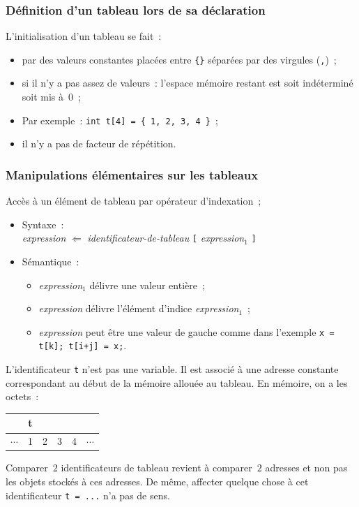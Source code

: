 \begin{frame}
  \frametitle{D\'efinition d'un tableau lors de sa d\'eclaration}
  L'initialisation d'un tableau se fait~:
  \begin{itemize}
  \item par des valeurs constantes plac\'ees entre {\tt \{\}}
    s\'epar\'ees par des virgules ({\tt ,})~;
  \item si il n'y a pas assez de valeurs~: l'espace m\'emoire restant est soit ind\'etermin\'e soit mis \`a~$0$~;
  \item Par exemple~: {\tt int t[4] = \{ 1, 2, 3, 4 \}}~;
  \item il n'y a pas de facteur de r\'ep\'etition.
  \end{itemize}
\end{frame}
\begin{frame}[fragile]
  \frametitle{Manipulations \'el\'ementaires sur les tableaux}
 Acc\`es \`a un \'el\'ement de tableau par op\'erateur d'indexation~;
 \begin{itemize}
 \item Syntaxe~: \\
   {\it expression} $\Leftarrow$ {\it identificateur-de-tableau} 
   {\tt [} {\it expression\/$_1$} {\tt ]}
 \item S\'{e}mantique~:
   \begin{itemize}
   \item {\it expression\/$_1$} d\'elivre une valeur enti\`ere~;
   \item {\it expression} d\'elivre l'\'el\'ement d'indice  {\it
       expression\/$_1$}~;
   \item {\it expression} peut \^etre une valeur de gauche comme
     dans l'exemple {\tt x = t[k]; t[i+j] = x;}.
   \end{itemize}
 \end{itemize}
 L'identificateur \verb?t? n'est pas une variable. Il est associ\'e
 \`a une adresse constante correspondant au d\'ebut de la m\'emoire
allou\'ee au tableau. En m\'emoire, on a les octets~:
 \begin{center}
   \begin{tabular}{c|c|c|c|c|c}
      & t  \\       \hline
      $\cdots$ & 1 & 2 & 3 & 4 &$\cdots$ \\ \hline
    \end{tabular}
  \end{center}
  Comparer~$2$ identificateurs de tableau revient \`a comparer~$2$
  adresses et non pas les objets stock\'es \`a ces adresses.  De
  m\^eme, affecter quelque chose \`a cet identificateur \verb?t = ...?
  n'a pas de sens.  
\end{frame}
